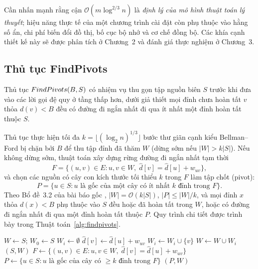 Cần nhấn mạnh rằng cận $\mathcal{O}(m\log^{2/3}n)$ là \emph{định lý của mô hình thuật toán lý thuyết}; hiệu năng thực tế của một chương trình cài đặt còn phụ thuộc vào hằng số ẩn, chi phí biến đổi đồ thị, bố cục bộ nhớ và cơ chế đồng bộ. Các khía cạnh thiết kế này sẽ được phân tích ở Chương~2 và đánh giá thực nghiệm ở Chương~3.

\subsection{Thủ tục FindPivots}

Thủ tục $\textsc{FindPivots}(B, S)$ có nhiệm vụ thu gọn tập nguồn biên $S$ trước khi đưa vào các lời gọi đệ quy ở tầng thấp hơn, dưới giả thiết mọi đỉnh chưa hoàn tất $v$ thỏa $d(v) < B$ đều có đường đi ngắn nhất đi qua ít nhất một đỉnh hoàn tất thuộc $S$.

Thủ tục thực hiện tối đa $k = \lfloor (\log_2 n)^{1/3} \rfloor$ bước thư giãn cạnh kiểu Bellman--Ford bị chặn bởi $B$ để thu tập đỉnh đã thăm $W$ (dừng sớm nếu $|W| > k|S|$). Nếu không dừng sớm, thuật toán xây dựng rừng đường đi ngắn nhất tạm thời
\begin{equation}
    F = \bigl\{(u, v) \in E : u, v \in W,\; \widehat{d}[v] = \widehat{d}[u] + w_{uv}\bigr\},
    \label{eq:pivot-forest}
\end{equation}
và chọn các nguồn có cây con kích thước tối thiểu $k$ trong $F$ làm tập chốt (pivot):
\begin{equation}
    P = \bigl\{u \in S : \text{$u$ là gốc của một cây có ít nhất $k$ đỉnh trong $F$}\bigr\}.
    \label{eq:pivot-set}
\end{equation}
Theo Bổ đề~3.2 của bài báo gốc \cite{duan2025breaking}, $|W| = \mathcal{O}(k|S|)$, $|P| \le |W|/k$, và mọi đỉnh $x$ thỏa $d(x) < B$ phụ thuộc vào $S$ đều hoặc đã hoàn tất trong $W$, hoặc có đường đi ngắn nhất đi qua một đỉnh hoàn tất thuộc $P$. Quy trình chi tiết được trình bày trong Thuật toán~\ref{alg:findpivots}.

\begin{algorithm}[htbp]
\caption{Thủ tục $\textsc{FindPivots}(B, S)$}
\label{alg:findpivots}
\begin{algorithmic}[1]
    \State $W \leftarrow S$; \; $W_0 \leftarrow S$
     
        \State $W_i \leftarrow \emptyset$
                \State $\widehat{d}[v] \leftarrow \widehat{d}[u] + w_{uv}$
                    \State $W_i \leftarrow W_i \cup \{v\}$
                \EndIf
            \EndIf
        \EndFor
        \State $W \leftarrow W \cup W_i$
         
            \State \Return $(S, W)$
        \EndIf
    \EndFor
    \State $F \leftarrow \{(u, v) \in E : u, v \in W,\; \widehat{d}[v] = \widehat{d}[u] + w_{uv}\}$
    \State $P \leftarrow \{u \in S : \text{$u$ là gốc của cây có $\ge k$ đỉnh trong $F$}\}$
    \State \Return $(P, W)$
\EndFunction
\end{algorithmic}
\end{algorithm}

